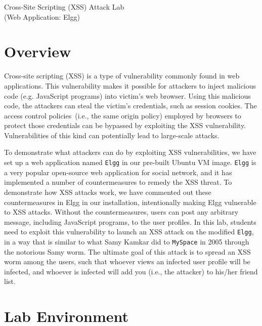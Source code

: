 




\begin{center}
{\LARGE Cross-Site Scripting (XSS) Attack Lab}
\vspace{0.1in}\\
{\Large (Web Application: Elgg)}
\end{center}
\copyrightnotice

\section{Overview}

Cross-site scripting (XSS) is a type of vulnerability commonly found
in web applications.  This vulnerability makes it possible for
attackers to inject malicious code (e.g. JavaScript programs) into victim's
web browser. Using this malicious code, the attackers can steal the
victim's credentials, such as session cookies.  The access control 
policies~(i.e., the same origin policy) employed by browsers to protect
those credentials can be bypassed by exploiting the XSS vulnerability.
Vulnerabilities of this kind can potentially lead to large-scale
attacks.

To demonstrate what attackers can do by exploiting XSS
vulnerabilities, we have set up a web application named 
{\tt Elgg} in our pre-built Ubuntu VM image.
{\tt Elgg} is a very popular open-source web application for
social network, and it has implemented a number of countermeasures 
to remedy the XSS threat. To demonstrate how XSS attacks work, we 
have commented out these countermeasures in Elgg in our installation, 
intentionally making Elgg vulnerable to XSS attacks.  
Without the countermeasures, users 
can post any arbitrary message, including JavaScript
programs, to the user profiles.  
In this lab, students need to exploit this vulnerability to 
launch an XSS attack on the modified {\tt Elgg}, in a way that is 
similar to what Samy Kamkar
did to {\tt MySpace} in 2005 through the notorious Samy worm. 
The ultimate goal of this attack is to spread an XSS worm among the users,
such that whoever views an infected user profile will be infected,
and whoever is infected will add you (i.e., the attacker) to 
his/her friend list. 



\section{Lab Environment}

